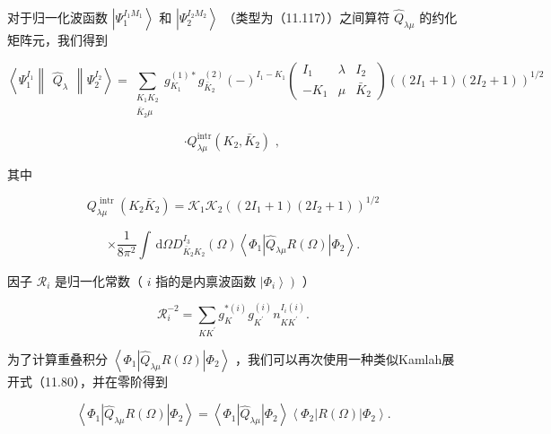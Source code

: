 对于归一化波函数 $\left|{\Psi}^{{I}_{1}{M}_{1}}_{1}\right\rangle $ 和 $\left|{\Psi}^{{I}_{2}{M}_{2}}_{2}\right\rangle $
（类型为（11.117））之间算符 ${\widehat{Q}}_{\lambda\mu}$ 的约化矩阵元，我们得到

\[
\left\langle {{\Psi}^{{I}_{1}}_{1}\begin{Vmatrix}{\widehat{Q}}_{\lambda}\end{Vmatrix}{\Psi}^{{I}_{2}}_{2}}\right\rangle =\mathop{\sum}\limits_{\substack{{{K}_{1}{K}_{2}}\\
{{\bar{K}}_{2}\mu}
}
}{g}^{\left(1\right)*}_{{K}_{1}}{g}^{\left(2\right)}_{{\bar{K}}_{2}}{\left(-\right)}^{{I}_{1}-{K}_{1}}\left(\begin{matrix}{I}_{1} & \lambda & {I}_{2}\\
-{K}_{1} & \mu & {\bar{K}}_{2}
\end{matrix}\right){\left(\left(2{I}_{1}+1\right)\left(2{I}_{2}+1\right)\right)}^{1/2}
\]

\[
\cdot{Q}^{\mathrm{{\mathrm{i}ntr}}}_{\lambda\mu}\left({{K}_{2},{\bar{K}}_{2}}\right)\text{ , }\tag{11.137}
\]

其中

\[
{Q}^{\text{ intr }}_{\lambda\mu}\left({{K}_{2}{\bar{K}}_{2}}\right)={\mathcal{K}}_{1}{\mathcal{K}}_{2}{\left(\left(2{I}_{1}+1\right)\left(2{I}_{2}+1\right)\right)}^{1/2}
\]

\[
\times\frac{1}{8{\pi}^{2}}\int{\,\mathrm{d}\Omega}{D}^{{I}_{3}}_{{\bar{K}}_{2}{K}_{2}}\left(\Omega\right)\left\langle {{\Phi}_{1}\left|{{\widehat{Q}}_{\lambda\mu}R\left(\Omega\right)}\right|{\Phi}_{2}}\right\rangle .\tag{11.138}
\]

因子 ${\mathcal{R}}_{i}$ 是归一化常数（ $i$ 指的是内禀波函数 $\left.\left|{\Phi}_{i}\right\rangle \right)$
）

\[
{\mathcal{R}}^{-2}_{i}=\mathop{\sum}\limits_{{K{K}^{\prime}}}{g}^{*\left(i\right)}_{K}{g}^{\left(i\right)}_{{K}^{\prime}}{n}^{{I}_{i}\left(i\right)}_{K{K}^{\prime}}.\tag{11.139}
\]

为了计算重叠积分 $\left\langle {{\Phi}_{1}\left|{{\widehat{Q}}_{\lambda\mu}R\left(\Omega\right)}\right|{\Phi}_{2}}\right\rangle $
，我们可以再次使用一种类似Kamlah展开式（11.80），并在零阶得到

\[
\left\langle {{\Phi}_{1}\left|{{\widehat{Q}}_{\lambda\mu}R\left(\Omega\right)}\right|{\Phi}_{2}}\right\rangle =\left\langle {{\Phi}_{1}\left|{\widehat{Q}}_{\lambda\mu}\right|{\Phi}_{2}}\right\rangle \left\langle {{\Phi}_{2}\left|{R\left(\Omega\right)}\right|{\Phi}_{2}}\right\rangle .\tag{11.140}
\]

